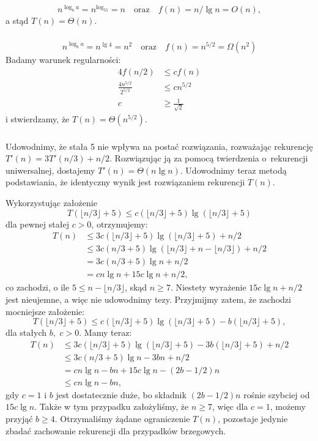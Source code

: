 \subsubsection{} %
\[
	n^{\log_ba} = n^{\log_55} = n \quad\text{oraz}\quad f(n) = n/\!\lg n = O(n),
\]
a stąd $T(n)=\Theta(n)$.

\subsubsection{} %
\[
	n^{\log_ba} = n^{\lg 4} = n^2 \quad\text{oraz}\quad f(n) = n^{5/2} = \Omega(n^2)
\]
Badamy warunek regularności:
\begin{align*}
	4f(n/2) &\le cf(n) \\
	\frac{4n^{5/2}}{2^{5/2}} &\le cn^{5/2} \\
	c &\ge \frac{1}{\sqrt{2}}
\end{align*}
i stwierdzamy, że $T(n)=\Theta(n^{5/2})$.

\subsubsection{} %
Udowodnimy, że stała 5 nie wpływa na postać rozwiązania, rozważając rekurencję $T'(n)=3T'(n/3)+n/2$. Rozwiązując ją za pomocą twierdzenia o~rekurencji uniwersalnej, dostajemy $T'(n)=\Theta(n\lg n)$. Udowodnimy teraz metodą podstawiania, że identyczny wynik jest rozwiązaniem rekurencji $T(n)$.

Wykorzystując założenie
\[
	T(\lfloor n/3\rfloor+5) \le c(\lfloor n/3\rfloor+5)\lg(\lfloor n/3\rfloor+5)
\]
dla pewnej stałej $c>0$, otrzymujemy:
\begin{align*}
	T(n) &\le 3c(\lfloor n/3\rfloor+5)\lg(\lfloor n/3\rfloor+5)+n/2 \\
	&\le 3c(n/3+5)\lg(\lfloor n/3\rfloor+n-\lfloor n/3\rfloor)+n/2 \\
	&= 3c(n/3+5)\lg n+n/2 \\
	&= cn\lg n+15c\lg n+n/2,
\end{align*}
co zachodzi, o ile $5\le n-\lfloor n/3\rfloor$, skąd $n\ge7$. Niestety wyrażenie $15c\lg n+n/2$ jest nieujemne, a więc nie udowodnimy tezy. Przyjmijmy zatem, że zachodzi mocniejsze założenie:
\[
	T(\lfloor n/3\rfloor+5) \le c(\lfloor n/3\rfloor+5)\lg(\lfloor n/3\rfloor+5)-b(\lfloor n/3\rfloor+5),
\]
dla stałych $b$,~$c>0$. Mamy teraz:
\begin{align*}
	T(n) &\le 3c(\lfloor n/3\rfloor+5)\lg(\lfloor n/3\rfloor+5)-3b(\lfloor n/3\rfloor+5)+n/2 \\
	&\le 3c(n/3+5)\lg n-3bn+n/2 \\
	&= cn\lg n-bn+15c\lg n-(2b-1/2)n \\
	&\le cn\lg n-bn,
\end{align*}
gdy $c=1$ i $b$ jest dostatecznie duże, bo składnik $(2b-1/2)n$ rośnie szybciej od $15c\lg n$. Także w tym przypadku założyliśmy, że $n\ge7$, więc dla $c=1$, możemy przyjąć $b\ge4$. Otrzymaliśmy żądane ograniczenie $T(n)$, pozostaje jedynie zbadać zachowanie rekurencji dla przypadków brzegowych.

